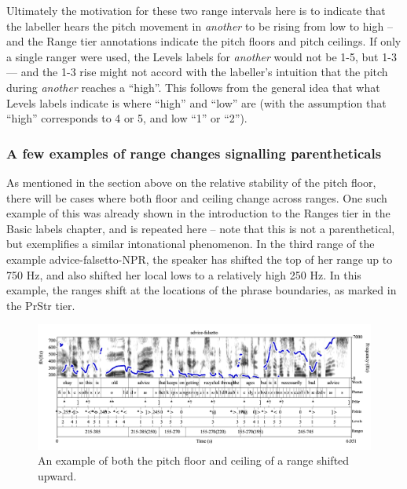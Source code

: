 \documentclass[11pt, twoside]{memoir}
\def\langtext#1{\textit{#1}}
\begin{document}
Ultimately the motivation for these two range intervals here is to indicate that the labeller hears the pitch movement in \langtext{another} to be rising from low to high – and the Range tier annotations indicate the pitch floors and pitch ceilings. If only a single ranger were used, the Levels labels for \langtext{another} would not be 1-5, but 1-3 — and the 1-3 rise might not accord with the labeller’s intuition that the pitch during \langtext{another} reaches a “high”. This follows from the general idea that what Levels labels indicate is where “high” and “low” are (with the assumption that “high” corresponds to 4 or 5, and low “1” or “2”).

\subsubsection{A few examples of range changes signalling parentheticals }\label{sec:a-few-examples-of-range-changes-signalling-parentheticals}

As mentioned in the section above on the relative stability of the pitch floor, there will be cases where both floor and ceiling change across ranges. One such example of this was already shown in the introduction to the Ranges tier in the Basic labels chapter, and is repeated here – note that this is not a parenthetical, but exemplifies a similar intonational phenomenon. In the third range of the example advice-falsetto-NPR, the speaker has shifted the top of her range up to 750 Hz, and also shifted her local lows to a relatively high 250 Hz. In this example, the ranges shift at the locations of the phrase boundaries, as marked in the PrStr tier.

\begin{figure}[H]
\centering
%
\includegraphics[width=\linewidth]{Ranges-advice-falsetto-advanced.png}
%
\caption{An example of both the pitch floor and ceiling of a range shifted upward.%
\label{fig:advice-falsetto Ranges Adv}%
}
\end{figure}
\end{document}

